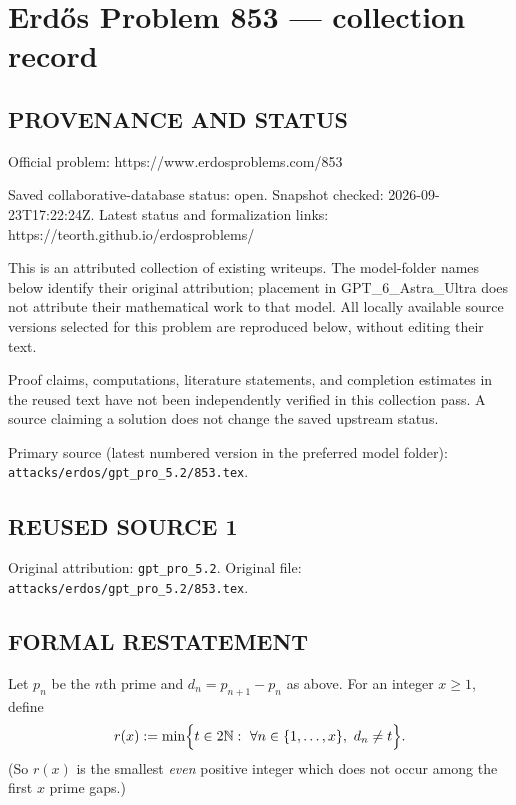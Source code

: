 \section*{Erd\H{o}s Problem 853 --- collection record}

\subsection*{PROVENANCE AND STATUS}
Official problem: https://www.erdosproblems.com/853

Saved collaborative-database status: open.
Snapshot checked: 2026-09-23T17:22:24Z.
Latest status and formalization links: https://teorth.github.io/erdosproblems/

This is an attributed collection of existing writeups. The model-folder names below identify their original attribution; placement in GPT\_6\_Astra\_Ultra does not attribute their mathematical work to that model. All locally available source versions selected for this problem are reproduced below, without editing their text.

Proof claims, computations, literature statements, and completion estimates in the reused text have not been independently verified in this collection pass. A source claiming a solution does not change the saved upstream status.

Primary source (latest numbered version in the preferred model folder): \texttt{attacks/erdos/gpt\_pro\_5.2/853.tex}.

\subsection*{REUSED SOURCE 1}
Original attribution: \texttt{gpt\_pro\_5.2}.
Original file: \texttt{attacks/erdos/gpt\_pro\_5.2/853.tex}.


\subsection*{FORMAL RESTATEMENT}
Let $p_n$ be the $n$th prime and $d_n=p_{n+1}-p_n$ as above. For an integer $x\ge 1$, define
\[
  r(x):= \min\Bigl\{ t\in 2\mathbb{N}:\ \forall n\in\{1,\dots,x\},\ d_n\ne t\Bigr\}.
\]
(So $r(x)$ is the smallest \emph{even} positive integer which does not occur among the first $x$ prime gaps.)

